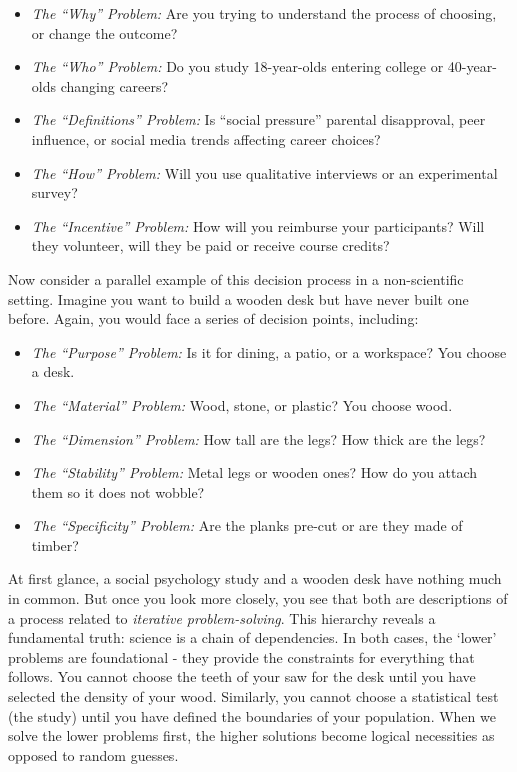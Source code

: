 \documentclass[
  letterpaper,
]{book}
\providecommand{\tightlist}{%
  \setlength{\itemsep}{0pt}\setlength{\parskip}{0pt}}\usepackage{longtable,booktabs,array}
\begin{document}
\begin{itemize}
\tightlist
\item
  \emph{The ``Why'' Problem:} Are you trying to understand the process
  of choosing, or change the outcome?
\item
  \emph{The ``Who'' Problem:} Do you study 18-year-olds entering college
  or 40-year-olds changing careers?
\item
  \emph{The ``Definitions'' Problem:} Is ``social pressure'' parental
  disapproval, peer influence, or social media trends affecting career
  choices?
\item
  \emph{The ``How'' Problem:} Will you use qualitative interviews or an
  experimental survey?
\item
  \emph{The ``Incentive'' Problem:} How will you reimburse your
  participants? Will they volunteer, will they be paid or receive course
  credits?
\end{itemize}

Now consider a parallel example of this decision process in a
non-scientific setting. Imagine you want to build a wooden desk but have
never built one before. Again, you would face a series of decision
points, including:

\begin{itemize}
\tightlist
\item
  \emph{The ``Purpose'' Problem:} Is it for dining, a patio, or a
  workspace? You choose a desk.
\item
  \emph{The ``Material'' Problem:} Wood, stone, or plastic? You choose
  wood.
\item
  \emph{The ``Dimension'' Problem:} How tall are the legs? How thick are
  the legs?
\item
  \emph{The ``Stability'' Problem:} Metal legs or wooden ones? How do
  you attach them so it does not wobble?
\item
  \emph{The ``Specificity'' Problem:} Are the planks pre-cut or are they
  made of timber?
\end{itemize}

At first glance, a social psychology study and a wooden desk have
nothing much in common. But once you look more closely, you see that
both are descriptions of a process related to \emph{iterative
problem-solving}. This hierarchy reveals a fundamental truth: science is
a chain of dependencies. In both cases, the `lower' problems are
foundational - they provide the constraints for everything that follows.
You cannot choose the teeth of your saw for the desk until you have
selected the density of your wood. Similarly, you cannot choose a
statistical test (the study) until you have defined the boundaries of
your population. When we solve the lower problems first, the higher
solutions become logical necessities as opposed to random guesses.
\end{document}
